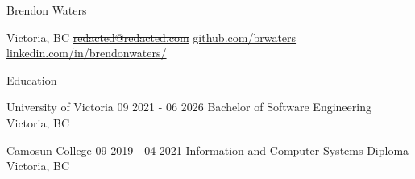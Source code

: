 \documentclass{resume}
\begin{document}
\begin{namesection}
    {Brendon Waters}
\end{namesection}

\begin{contactsection}
    {Victoria, BC}
    {\href{mailto:redacted@redacted.com}{\sout{redacted@redacted.com}}}
    {\href{https://github.com/brwaters}{github.com/brwaters}}
    {\href{https://www.linkedin.com/in/brendonwaters/}{linkedin.com/in/brendonwaters/}}
\end{contactsection}

\begin{headersection}
    {Education}
\end{headersection}
\begin{generalsection}
    {University of Victoria}
    {09 2021 - 06 2026}
    {Bachelor of Software Engineering}
    {Victoria, BC}
\end{generalsection}
\begin{generalsection}
    {Camosun College}
    {09 2019 - 04 2021}
    {Information and Computer Systems Diploma}
    {Victoria, BC}
\end{generalsection}
\end{document}
